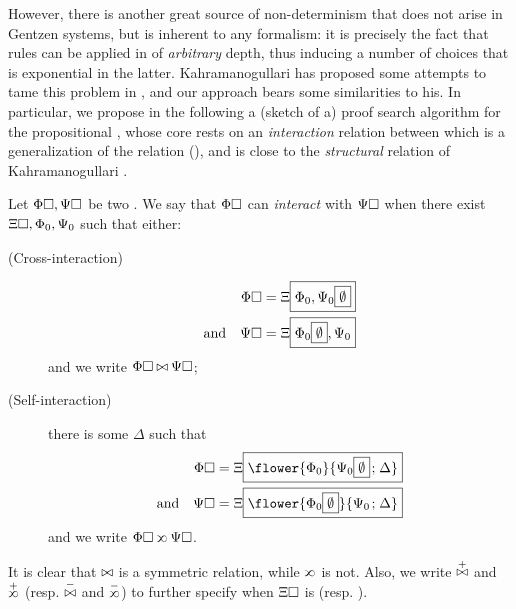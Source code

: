 \begin{scope}
However, there is another great source of non-determinism that does not arise in
Gentzen systems, but is inherent to any  formalism: it is
precisely the fact that rules can be applied in  of \emph{arbitrary}
depth, thus inducing a number of choices that is exponential in the latter.
Kahramanogullari has proposed some attempts to tame this problem in
, and our approach bears some
similarities to his. In particular, we propose in the following a (sketch of a)
proof search algorithm for the propositional , whose core rests
on an \emph{interaction} relation between  which is a generalization of
the  relation (), and is close to the
\emph{structural} relation of Kahramanogullari
\cite[Definition~2.13]{lmcs:1089}.


\begin{definition}[Interaction]
  
  Let $\Phi\square, \Psi\square$ be two . We say that $\Phi\square$ can
  \emph{interact} with $\Psi\square$ when there exist  $\Xi\square,
  \Phi_{0}, \Psi_{0}$ such that either:
  \begin{description}
    \item[(Cross-interaction)]
    \begin{align*}
      \Phi\square &= \Xi\fbox{$\Phi_{0}, \Psi_0\fbox{$\emptyset$}$} \\
      \text{and}\quad \Psi\square &= \Xi\fbox{$\Phi_0\fbox{$\emptyset$}, \Psi_{0}$}
    \end{align*}
    and we write $\Phi\square \mathbin{\bowtie} \Psi\square$;
    \item[(Self-interaction)] there is some $\Delta$ such that
    \begin{align*}
      \Phi\hole &= \Xi\select{\flower{\Phi_{0}}{\Psi_0\select{\emptyset} \sep \Delta}} \\
      \text{and}\quad \Psi\hole &= \Xi\select{\flower{\Phi_0\select{\emptyset}}{\Psi_{0} \sep \Delta}}
    \end{align*}
    and we write $\Phi\hole \sinter \Psi\hole$.
  \end{description}
  It is clear that $\mathbin{\bowtie}$ is a symmetric relation, while $\sinter$ is not.
  Also, we write $\cinterpos$ and $\sinterpos$ (resp. $\cinterneg$ and
  $\sinterneg$) to further specify when $\Xi\square$ is  (resp. ).
\end{definition}


\end{scope}
